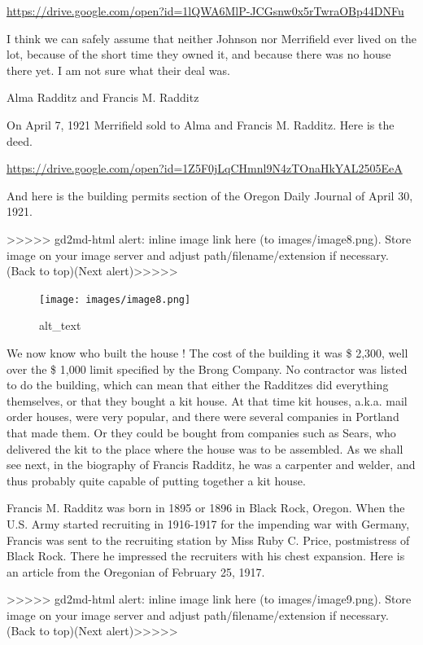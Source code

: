 \documentclass[
  12pt,
]{book}
\begin{document}
\url{https://drive.google.com/open?id=1lQWA6MlP-JCGsnw0x5rTwraOBp44DNFu}

I think we can safely assume that neither Johnson nor Merrifield ever lived on the lot, because of the short time they owned it, and because there was no house there yet. I am not sure what their deal was.

Alma Radditz and Francis M. Radditz

On April 7, 1921 Merrifield sold to Alma and Francis M. Radditz. Here is the deed.

\url{https://drive.google.com/open?id=1Z5F0jLqCHmnl9N4zTOnaHkYAL2505EeA}

And here is the building permits section of the Oregon Daily Journal of April 30, 1921.

{\textgreater\textgreater\textgreater\textgreater\textgreater{} gd2md-html alert: inline image link here (to images/image8.png). Store image on your image server and adjust path/filename/extension if necessary. }(Back to top)(Next alert){\textgreater\textgreater\textgreater\textgreater\textgreater{} }

\begin{figure}
\centering
\texttt{[image: images/image8.png]}
\caption{alt\_text}
\end{figure}

We now know who built the house ! The cost of the building it was \$ 2,300, well over the \$ 1,000 limit specified by the Brong Company. No contractor was listed to do the building, which can mean that either the Radditzes did everything themselves, or that they bought a kit house. At that time kit houses, a.k.a. mail order houses, were very popular, and there were several companies in Portland that made them. Or they could be bought from companies such as Sears, who delivered the kit to the place where the house was to be assembled. As we shall see next, in the biography of Francis Radditz, he was a carpenter and welder, and thus probably quite capable of putting together a kit house.

Francis M. Radditz was born in 1895 or 1896 in Black Rock, Oregon. When the U.S. Army started recruiting in 1916-1917 for the impending war with Germany, Francis was sent to the recruiting station by Miss Ruby C. Price, postmistress of Black Rock. There he impressed the recruiters with his chest expansion. Here is an article from the Oregonian of February 25, 1917.

{\textgreater\textgreater\textgreater\textgreater\textgreater{} gd2md-html alert: inline image link here (to images/image9.png). Store image on your image server and adjust path/filename/extension if necessary. }(Back to top)(Next alert){\textgreater\textgreater\textgreater\textgreater\textgreater{} }
\end{document}
